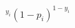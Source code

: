 \documentclass[preview]{standalone}
\begin{document}
\begin{align*}
^{y_i}(1-p_i)^{1-y_i}
\end{align*}
\end{document}
